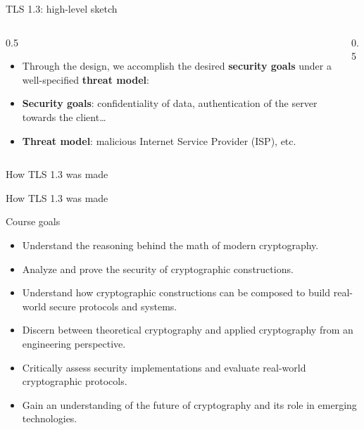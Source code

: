 \documentclass[aspectratio=169, lualatex, handout]{beamer}
\begin{document}
	\begin{frame}{TLS 1.3: high-level sketch}
		\begin{columns}[c]
			\begin{column}{0.5\textwidth}
				\begin{itemize}
					\item Through the design, we accomplish the desired \textbf{security
						goals} under a well-specified \textbf{threat model}:

					\item \textbf{Security goals}: confidentiality of data, authentication
						of the server towards the client\ldots

					\item \textbf{Threat model}: malicious Internet Service Provider (ISP),
						etc.
				\end{itemize}
			\end{column}

			\begin{column}{0.5\textwidth}
			\end{column}
		\end{columns}
	\end{frame}

	\begin{frame}{How TLS 1.3 was made}
	\end{frame}

	\begin{frame}{How TLS 1.3 was made}
	\end{frame}

	\begin{frame}{Course goals}
		\begin{itemize}
			\item Understand the reasoning behind the math of modern cryptography.

			\item Analyze and prove the security of cryptographic constructions.

			\item Understand how cryptographic constructions can be composed to build real-world
				secure protocols and systems.

			\item Discern between theoretical cryptography and applied cryptography from
				an engineering perspective.

			\item Critically assess security implementations and evaluate real-world cryptographic
				protocols.

			\item Gain an understanding of the future of cryptography and its role in emerging
				technologies.
		\end{itemize}
	\end{frame}
\end{document}
